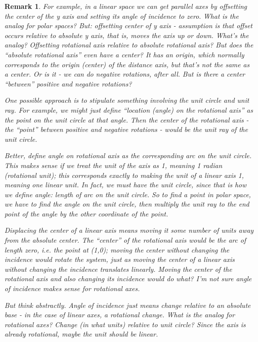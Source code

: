 \documentclass[12pt]{tufte-handout}
\numberwithin{equation}{subsection}
\numberwithin{equation}{subsection}
\newtheorem{remark}{Remark}
\begin{document}
{\begin{description}
\begin{remark}
      For example, in a linear space we can get parallel axes by
      offsetting the center of the y axis and setting its angle of
      incidence to zero.  What is the analog for polar spaces?  But:
      offsetting center of y axis - assumption is that offset occurs
      relative to absolute y axis, that is, moves the axis up or
      down.  What's the analog?  Offsetting rotational axis relative
      to absolute rotational axis?  But does the ``absolute
      rotational axis'' even have a center?  It has an origin, which
      normally corresponds to the origin (center) of the distance
      axis, but that's not the same as a center.  Or is it - we can
      do negative rotations, after all.  But is there a center
      ``between'' positive and negative rotations?

      One possible approach is to stipulate something involving the
      unit circle and unit ray.  For example, we might just define
      ``location (angle) on the rotational axis'' as the point on
      the unit circle at that angle.  Then the center of the
      rotational axis - the ``point'' between positive and negative
      rotations - would be the unit ray of the unit circle.

      Better, define angle on rotational axis as the corresponding
      arc on the unit circle.  This makes sense if we treat the unit
      of the axis as 1, meaning 1 radian (rotational unit); this
      corresponds exactly to making the unit of a linear axis 1,
      meaning one linear unit.  In fact, we must have the unit
      circle, since that is how we define angle: length of arc on
      the unit circle.  So to find a point in polar space, we have
      to find the angle on the unit circle, then multiply the unit
      ray to the end point of the angle by the other coordinate of
      the point.

      Displacing the center of a linear axis means moving it some
      number of units away from the absolute center.  The ``center''
      of the rotational axis would be the arc of length zero,
      i.e. the point at (1,0); moving the center without changing
      the incidence would rotate the system, just as moving the
      center of a linear axis without changing the incidence
      translates linearly.  Moving the center of the rotational axis
      and also changing its incidence would do what?  I'm not sure
      angle of incidence makes sense for rotational axes.

      But think abstractly.  Angle of incidence just means change
      relative to an absolute base - in the case of linear axes, a
      rotational change.  What is the analog for rotational axes?
      Change (in what units) relative to unit circle?  Since the
      axis is already rotational, maybe the unit should be linear.


\end{remark}
\end{description}}
\end{document}
